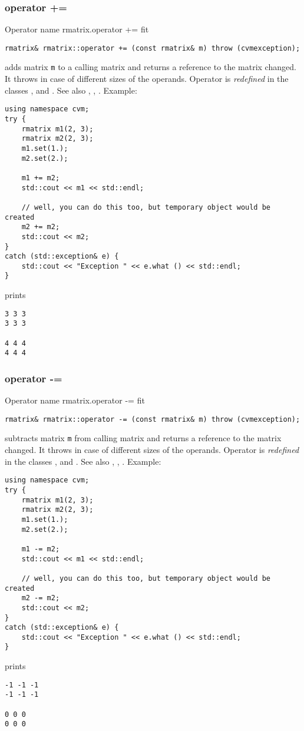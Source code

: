 \subsubsection{operator +=}
Operator%
\pdfdest name {rmatrix.operator +=} fit
\begin{verbatim}
rmatrix& rmatrix::operator += (const rmatrix& m) throw (cvmexception);
\end{verbatim}
adds  matrix \verb"m" to a calling matrix
and returns a reference to
the matrix changed.
It throws  
in case of different sizes of the operands.
Operator is \emph{redefined} in the classes
, 
and .
See also ,
,
.
Example:
\begin{Verbatim}
using namespace cvm;
try {
    rmatrix m1(2, 3);
    rmatrix m2(2, 3);
    m1.set(1.);
    m2.set(2.);

    m1 += m2;
    std::cout << m1 << std::endl;

    // well, you can do this too, but temporary object would be created
    m2 += m2;
    std::cout << m2;
}
catch (std::exception& e) {
    std::cout << "Exception " << e.what () << std::endl;
}
\end{Verbatim}
prints
\begin{Verbatim}
3 3 3
3 3 3

4 4 4
4 4 4
\end{Verbatim}
\newpage




\subsubsection{operator -=}
Operator%
\pdfdest name {rmatrix.operator -=} fit
\begin{verbatim}
rmatrix& rmatrix::operator -= (const rmatrix& m) throw (cvmexception);
\end{verbatim}
subtracts  matrix \verb"m" from  calling matrix
and returns a reference to
the matrix changed.
It throws  
in case of different sizes of the operands.
Operator is \emph{redefined} in the classes
, 
and .
See also ,
,
.
Example:
\begin{Verbatim}
using namespace cvm;
try {
    rmatrix m1(2, 3);
    rmatrix m2(2, 3);
    m1.set(1.);
    m2.set(2.);

    m1 -= m2;
    std::cout << m1 << std::endl;

    // well, you can do this too, but temporary object would be created
    m2 -= m2;
    std::cout << m2;
}
catch (std::exception& e) {
    std::cout << "Exception " << e.what () << std::endl;
}
\end{Verbatim}
prints
\begin{Verbatim}
-1 -1 -1
-1 -1 -1

0 0 0
0 0 0
\end{Verbatim}
\newpage





